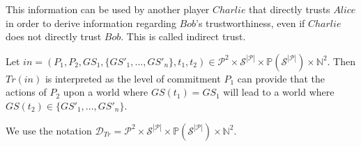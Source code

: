   This information can be used by another player $Charlie$ that directly trusts $Alice$ in order to derive information
  regarding $Bob$'s trustworthiness, even if $Charlie$ does not directly trust $Bob$. This is called indirect trust.

    \begin{definition}[Trust]
      
    \end{definition}
    \noindent Let $in = \left(P_1, P_2, GS_1, \{GS'_1, ...,GS'_n\}, t_1, t_2\right) \in \mathcal{P}^2 \times
    \mathcal{S}^{|\mathcal{P}|} \times \mathbb{P}\left(\mathcal{S}^{|\mathcal{P}|}\right) \times \mathbb{N}^2$. Then
    $Tr\left(in\right)$ is interpreted as the level of commitment $P_1$ can provide that the actions of $P_2$ upon a world where
    $GS\left(t_1\right) = GS_1$ will lead to a world where $GS\left(t_2\right) \in \{GS'_1, ...,GS'_n\}$.

    We use the notation $\mathcal{D}_{Tr} = \mathcal{P}^2 \times \mathcal{S}^{|\mathcal{P}|} \times
    \mathbb{P}\left(\mathcal{S}^{|\mathcal{P}|}\right) \times \mathbb{N}^2$.

